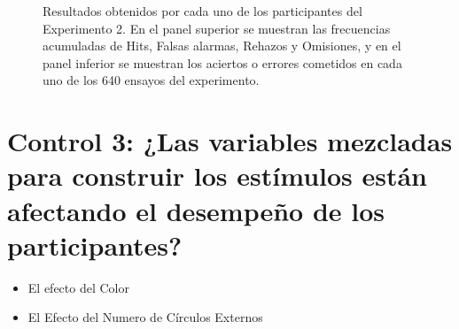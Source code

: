 \begin{figure}[th]
\caption[Resultados obtenidos por ensayo; Experimento 2]{Resultados obtenidos por cada uno de los participantes del Experimento 2. En el panel superior se muestran las frecuencias acumuladas de Hits, Falsas alarmas, Rehazos y Omisiones, y en el panel inferior se muestran los aciertos o errores cometidos en cada uno de los 640 ensayos del experimento.}
\label{fig:Outcome_E2}
\end{figure}












\section{Control 3: ¿Las variables mezcladas para construir los estímulos están afectando el desempeño de los participantes?}



\begin{itemize}
\item El efecto del Color
\item El Efecto del Numero de Círculos Externos
\end{itemize}

